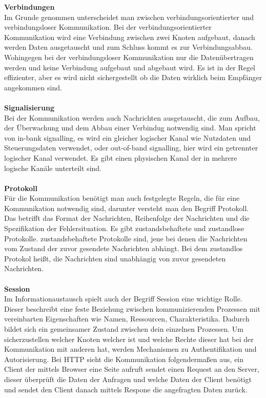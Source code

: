\documentclass[a4paper,12pt]{article}
\begin{document}
\textbf{Verbindungen\\}
Im Grunde genommen unterscheidet man zwischen verbindungsorientierter und verbindungsloser Kommunikation. Bei der verbindungsorientierter Kommunikation wird eine Verbindung zwischen zwei Knoten aufgebaut, danach werden Daten ausgetauscht und zum Schluss kommt es zur
Verbindungsabbau. Wohingegen bei der verbindungsloser Kommunikation nur die Datenübertragen werden und keine Verbindung aufgebaut und abgebaut wird. Es ist in der Regel effizienter, aber es wird nicht sichergestellt ob die Daten wirklich beim Empfänger angekommen sind.\\ \\
\textbf{Signalisierung\\}
Bei der Kommunikation werden auch Nachrichten ausgetauscht, die zum Aufbau, der Überwachung und dem Abbau einer Verbindug notwendig sind. Man spricht von in-bank signalling, es wird ein gleicher logischer Kanal wie Nutzdaten und Steuerungsdaten verwendet, oder out-of-band signalling, hier wird ein getrennter logischer Kanal verwendet. Es gibt einen
physischen Kanal der in mehrere logische Kanäle unterteilt sind. \\ \\
\textbf{Protokoll\\}
Für die Kommunikation benötigt man auch festgelegte Regeln, die für eine Kommunikation notwendig sind, darunter versteht man den Begriff Protokoll. Das betrifft das Format der Nachrichten, Reihenfolge der Nachrichten und die Spezifikation der Fehlersituation. Es gibt zustandsbehaftete und zustandlose Protokolle. zustandsbehaftete Protokolle sind, jene bei denen die Nachrichten
vom Zustand der zuvor gesendete Nachrichten abhängt. Bei dem zustandlos Protokol heißt, die Nachrichten sind unabhängig von zuvor gesendeten Nachrichten.\\\\
\textbf{Session\\}
Im Informationaustausch spielt auch der Begriff Session eine wichtige Rolle. Dieser beschreibt eine feste Beziehung zwischen kommunizierenden Prozessen mit vereinbarten Eigenschaften wie Namen, Ressourcen, Charakteristika. Dadurch bildet sich ein gemeinsamer Zustand zwischen dein einzelnen Prozessen. Um sicherzustellen welcher Knoten welcher ist und welche Rechte dieser hat 
bei der Kommunikation mit anderen hat, werden Mechanismen zu Authentifikation und Autorisierung. Bei HTTP sieht die Kommunikation folgendermaßen aus, ein Client der mittels Browser eine Seite aufruft sendet einen Request an den Server, dieser überprüft die Daten der Anfragen und welche Daten der Client benötigt und sendet den Client danach mittels Respone die angefragten Daten zurück.\\
\end{document}
